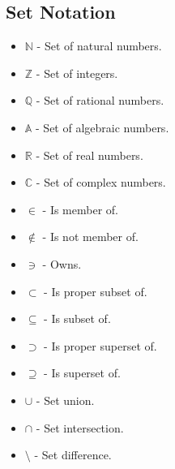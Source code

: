 \documentclass[fullpage]{article}
\begin{document}
\subsection*{Set Notation}
\begin{itemize}
    \item $\mathbb{N}$ - Set of natural numbers.
    \item $\mathbb{Z}$ - Set of integers.
    \item $\mathbb{Q}$ - Set of rational numbers.
    \item $\mathbb{A}$ - Set of algebraic numbers.
    \item $\mathbb{R}$ - Set of real numbers.
    \item $\mathbb{C}$ - Set of complex numbers.
    \item $\in$ - Is member of.
    \item $\notin$ - Is not member of.
    \item $\ni$ - Owns.
    \item $\subset$ - Is proper subset of.
    \item $\subseteq$ - Is subset of.
    \item $\supset$ - Is proper superset of.
    \item $\supseteq$ - Is superset of.
    \item $\cup$ - Set union.
    \item $\cap$ - Set intersection.
    \item $\setminus$ - Set difference.
\end{itemize}
\end{document}
